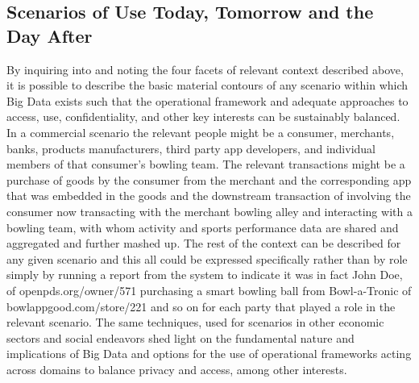  \subsection{Scenarios of Use Today, Tomorrow and the Day After}


By inquiring into and noting the four facets of relevant context described above, it is possible to describe the basic material contours of any scenario within which Big Data exists such that the operational framework and adequate approaches to access, use, confidentiality, and other key interests can be sustainably balanced.
In a commercial scenario the relevant people might be a consumer, merchants, banks, products manufacturers, third party app developers, and individual members of that consumer’s bowling team.
The relevant transactions might be a purchase of goods by the consumer from the merchant and the corresponding app that was embedded in the goods and the downstream transaction of involving the consumer now transacting with the merchant bowling alley and interacting with a bowling team, with whom activity and sports performance data are shared and aggregated and further mashed up.
The rest of the context can be described for any given scenario and this all could be expressed specifically rather than by role simply by running a report from the system to indicate it was in fact John Doe, of openpds.org/owner/571 purchasing a smart bowling ball from Bowl-a-Tronic of bowlappgood.com/store/221 and so on for each party that played a role in the relevant scenario. 
The same techniques, used for scenarios in other economic sectors and social endeavors shed light on the fundamental nature and implications of Big Data and options for the use of operational frameworks acting across domains to balance privacy and access, among other interests.



